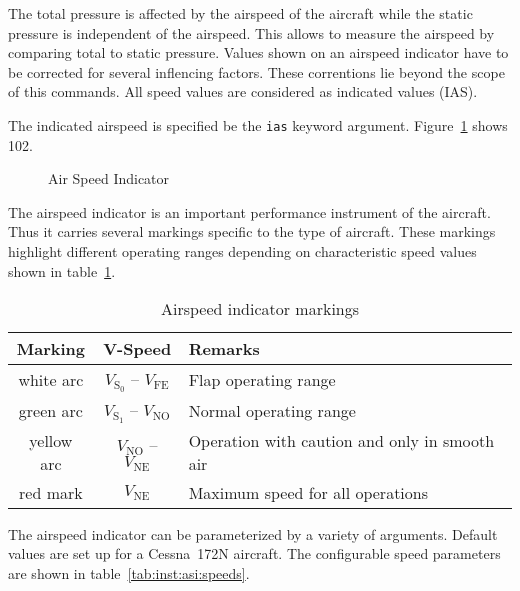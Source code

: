 The total pressure is affected by the airspeed of the aircraft while the static
pressure is independent of the airspeed. This allows to measure the airspeed by
comparing total to static pressure. Values shown on an airspeed indicator have
to be corrected for several inflencing factors. These correntions lie beyond
the scope of this commands. All speed values are considered as indicated values
(IAS).

The indicated airspeed is specified be the \texttt{ias} keyword argument.
Figure~\ref{fig:inst:asi:c172n} shows \SI{102}{\KIAS}.

\begin{figure}[!h]
\centering
{}
\caption{Air Speed Indicator}
\label{fig:inst:asi:c172n}
\end{figure}

The airspeed indicator is an important performance instrument of the aircraft.
Thus it carries several markings specific to the type of aircraft. These
markings highlight different operating ranges depending on characteristic speed
values shown in table~\ref{tab:inst:asi:markings}.

\begin{table}
\centering
\begin{tabular}{ccl}
\toprule
Marking    & V-Speed                             & Remarks                                       \\
\midrule
white arc  & $V_\mathrm{S_0}$ -- $V_\mathrm{FE}$ & Flap operating range                          \\
green arc  & $V_\mathrm{S_1}$ -- $V_\mathrm{NO}$ & Normal operating range                        \\
yellow arc & $V_\mathrm{NO}$  -- $V_\mathrm{NE}$ & Operation with caution and only in smooth air \\
red mark   & $V_\mathrm{NE}$                     & Maximum speed for all operations              \\
\bottomrule
\end{tabular}
\caption{Airspeed indicator markings}
\label{tab:inst:asi:markings}
\end{table}

The airspeed indicator can be parameterized by a variety of arguments. Default
values are set up for a Cessna~172N aircraft. The configurable speed parameters
are shown in table~\ref{tab:inst:asi:speeds}.

